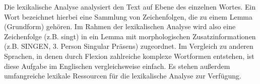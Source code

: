 Die lexikalische Analyse analysiert den Text auf Ebene des einzelnen Wortes. Ein Wort bezeichnet hierbei eine Sammlung von Zeichenfolgen, die zu einem Lemma (Grundform) gehören. Im Rahmen der lexikalischen Analyse wird also eine Zeichenfolge (z.B. singt) in ein Lemma mit morphologischen Zusatzinformationen (z.B. SINGEN, 3. Person Singular Präsens) zugeordnet. Im Vergleich zu anderen Sprachen, in denen durch Flexion zahlreiche komplexe Wortformen entstehen, ist diese Aufgabe im Englischen vergleichsweise einfach. Es stehen außerdem umfangreiche lexikale Ressourcen für die lexikalische Analyse zur Verfügung.












